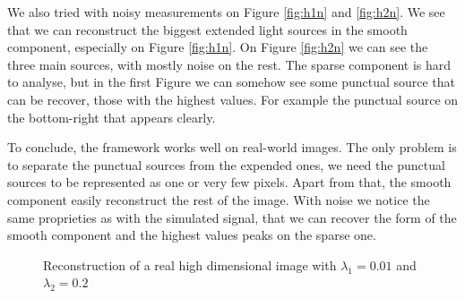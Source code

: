 \documentclass[a4paper,11pt,oneside]{report}
\theoremstyle{named}
\begin{document}
We also tried with noisy measurements on Figure \ref{fig:h1n} and \ref{fig:h2n}. We see that we can reconstruct the biggest extended light sources in the smooth component, especially on Figure \ref{fig:h1n}. On Figure \ref{fig:h2n} we can see the three main  sources, with mostly noise on the rest. The sparse component is hard to analyse, but in the first Figure we can somehow see some punctual source that can be recover, those with the highest values. For example the punctual source on the bottom-right that appears clearly.

To conclude, the framework works well on real-world images. The only problem is to separate the punctual sources from the expended ones, we need the punctual sources to be represented as one or very few pixels. Apart from that, the smooth component easily reconstruct the rest of the image. With noise we notice the same proprieties as with the simulated signal, that we can recover the form of the smooth component and the highest values peaks on the sparse one.

\begin{figure}
    \centering
    \caption{Reconstruction of a real high dimensional image with $\lambda_1 = 0.01$ and $\lambda_2 = 0.2$}
    \label{fig:h3}
\end{figure}
\end{document}
